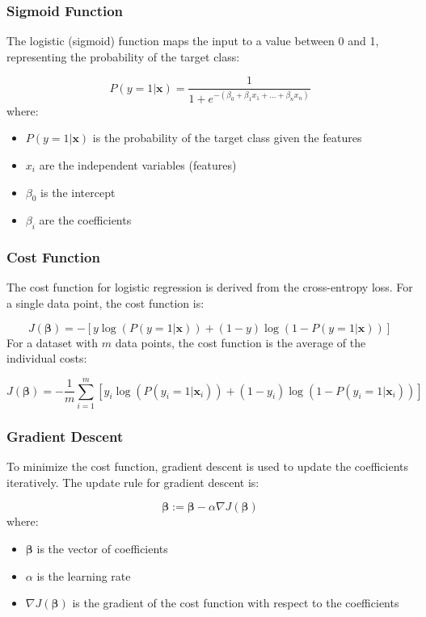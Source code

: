 \documentclass[12pt]{article}
\begin{document}
\subsubsection{Sigmoid Function}

The logistic (sigmoid) function maps the input to a value between 0 and 1, representing the probability of the target class:

$$P(y=1 | \mathbf{x}) = \frac{1}{1 + e^{-(\beta_0 + \beta_1 x_1 + \dots + \beta_n x_n)}}$$
where:
\begin{itemize}
\item $P(y=1 | \mathbf{x})$ is the probability of the target class given the features
\item $x_i$ are the independent variables (features)
\item $\beta_0$ is the intercept
\item $\beta_i$ are the coefficients
\end{itemize}

\subsubsection{Cost Function}

The cost function for logistic regression is derived from the cross-entropy loss. For a single data point, the cost function is:

$$ J(\boldsymbol{\beta}) = -[y \log(P(y=1 | \mathbf{x})) + (1 - y) \log(1 - P(y=1 | \mathbf{x}))] $$
For a dataset with $m$ data points, the cost function is the average of the individual costs:

$$J(\boldsymbol{\beta}) = -\frac{1}{m}\sum_{i=1}^m [y_i \log(P(y_i=1 | \mathbf{x}_i)) + (1 - y_i) \log(1 - P(y_i=1 | \mathbf{x}_i))]$$

\subsubsection{Gradient Descent}

To minimize the cost function, gradient descent is used to update the coefficients iteratively. The update rule for gradient descent is:

$$\boldsymbol{\beta} := \boldsymbol{\beta} - \alpha \nabla J(\boldsymbol{\beta})$$
where:
\begin{itemize}
\item $\boldsymbol{\beta}$ is the vector of coefficients
\item $\alpha$ is the learning rate
\item $\nabla J(\boldsymbol{\beta})$ is the gradient of the cost function with respect to the coefficients
\end{itemize}
\end{document}
